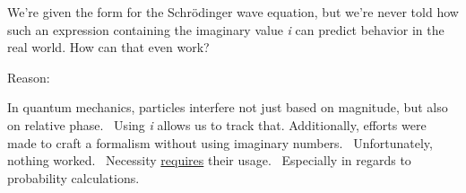 We're given the form for the Schrödinger wave equation, but we're never told
how such an expression containing the imaginary value \textit{i} can predict
behavior in the real world. How can that even work?

Reason:

In quantum mechanics, particles interfere not just based on magnitude, but also
on relative phase. \ Using \textit{i} allows us to track that.
Additionally, efforts were made to craft a formalism without using
imaginary numbers. \ Unfortunately, nothing worked. \ Necessity
\underline{requires} their usage. \ Especially in regards to probability
calculations.